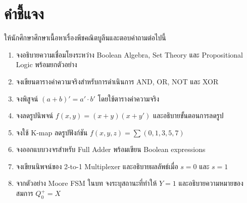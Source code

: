 \section*{คำชี้แจง} ให้นักศึกษาศึกษาเนื้อหาเรื่องพีชคณิตบูลีนและตอบคำถามต่อไปนี้
\begin{enumerate}
    \item จงอธิบายความเชื่อมโยงระหว่าง Boolean Algebra, Set Theory และ Propositional Logic พร้อมยกตัวอย่าง
    \item จงเขียนตารางค่าความจริงสำหรับการดำเนินการ AND, OR, NOT และ XOR
    \item จงพิสูจน์ $(a + b)' = a' \cdot b'$ โดยใช้ตารางค่าความจริง
    \item จงลดรูปนิพจน์ $f(x,y) = (x + y)(x + y')$ และอธิบายขั้นตอนการลดรูป
    \item จงใช้ K-map ลดรูปฟังก์ชัน $f(x,y,z) = \sum(0, 1, 3, 5, 7)$
    \item จงออกแบบวงจรสำหรับ Full Adder พร้อมเขียน Boolean expressions
    \item จงเขียนนิพจน์ของ 2-to-1 Multiplexer และอธิบายผลลัพธ์เมื่อ $s=0$ และ $s=1$
    \item จากตัวอย่าง Moore FSM ในบท จงระบุสถานะที่ทำให้ $Y=1$ และอธิบายความหมายของสมการ $Q_0^+=X$
\end{enumerate}
